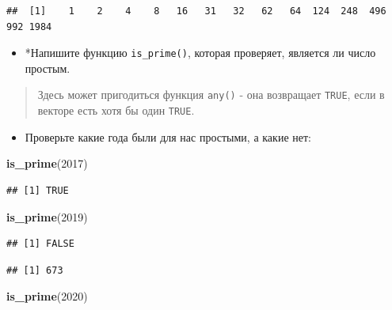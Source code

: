 \documentclass[]{book}
\newenvironment{Shaded}{\begin{snugshade}}{\end{snugshade}}
\newcommand{\KeywordTok}[1]{\textcolor[rgb]{0.13,0.29,0.53}{\textbf{#1}}}
\newcommand{\DecValTok}[1]{\textcolor[rgb]{0.00,0.00,0.81}{#1}}
\newcommand{\CommentTok}[1]{\textcolor[rgb]{0.56,0.35,0.01}{\textit{#1}}}
\newcommand{\OperatorTok}[1]{\textcolor[rgb]{0.81,0.36,0.00}{\textbf{#1}}}
\newcommand{\NormalTok}[1]{#1}
\providecommand{\tightlist}{%
  \setlength{\itemsep}{0pt}\setlength{\parskip}{0pt}}
\begin{document}
\begin{verbatim}
##  [1]    1    2    4    8   16   31   32   62   64  124  248  496  992 1984
\end{verbatim}

\begin{itemize}
\tightlist
\item
  *Напишите функцию \texttt{is\_prime()}, которая проверяет, является ли
  число простым.
\end{itemize}

\begin{quote}
Здесь может пригодиться функция \texttt{any()} - она возвращает
\texttt{TRUE}, если в векторе есть хотя бы один \texttt{TRUE}.
\end{quote}

\begin{itemize}
\tightlist
\item
  Проверьте какие года были для нас простыми, а какие нет:
\end{itemize}

\begin{Shaded}
\begin{Highlighting}[]
\KeywordTok{is_prime}\NormalTok{(}\DecValTok{2017}\NormalTok{)}
\end{Highlighting}
\end{Shaded}

\begin{verbatim}
## [1] TRUE
\end{verbatim}

\begin{Shaded}
\begin{Highlighting}[]
\KeywordTok{is_prime}\NormalTok{(}\DecValTok{2019}\NormalTok{)}
\end{Highlighting}
\end{Shaded}

\begin{verbatim}
## [1] FALSE
\end{verbatim}

\begin{Shaded}
\end{Shaded}

\begin{verbatim}
## [1] 673
\end{verbatim}

\begin{Shaded}
\begin{Highlighting}[]
\KeywordTok{is_prime}\NormalTok{(}\DecValTok{2020}\NormalTok{)}
\end{Highlighting}
\end{Shaded}
\end{document}

